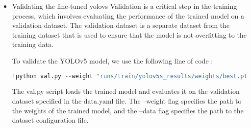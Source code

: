 \begin{itemize}
\FloatBarrier
\begin{table}[h]

\centering
{}


\end{table}

\FloatBarrier


The training output shows that the model achieves a precision of 0.999, a recall of 1, mAP50 of 0.995, and mAP50-95 of 0.889. These metrics indicate that the model has learned to detect objects with high accuracy.

\item{Validating the fine-tuned yolovs}
Validation is a critical step in the training process, which involves evaluating the performance of the trained model on a validation dataset. The validation dataset is a separate dataset from the training dataset that is used to ensure that the model is not overfitting to the training data.

To validate the YOLOv5 model, we use the following  line of code :
\begin{lstlisting}[language=Python]
!python val.py --weight "runs/train/yolov5s_results/weights/best.pt" --data "/content/yolov5/LogoDetection-3/data.yaml"
\end{lstlisting}
The val.py script loads the trained model and evaluates it on the validation dataset specified in the data.yaml file. The --weight flag specifies the path to the weights of the trained model, and the --data flag specifies the path to the dataset configuration file.
\FloatBarrier

\begin{table}[h]

\centering
{}
\end{table}
\end{itemize}
